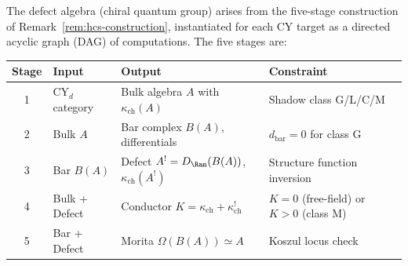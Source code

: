 The defect algebra (chiral quantum group) arises from the five-stage construction of Remark~\ref{rem:hcs-construction}, instantiated for each CY target as a directed acyclic graph (DAG) of computations. The five stages are:
\begin{center}
\small
\renewcommand{\arraystretch}{1.3}
\begin{tabular}{clll}
\toprule
\textbf{Stage} & \textbf{Input} & \textbf{Output} & \textbf{Constraint} \\
\midrule
1 & CY$_d$ category & Bulk algebra $A$ with $\kappa_{\mathrm{ch}}(A)$ & Shadow class G/L/C/M \\
2 & Bulk $A$ & Bar complex $B(A)$, differentials & $d_{\mathrm{bar}} = 0$ for class G \\
3 & Bar $B(A)$ & Defect $A^! = D_{\Ran}(B(A))$, $\kappa_{\mathrm{ch}}(A^!)$ & Structure function inversion \\
4 & Bulk + Defect & Conductor $K = \kappa_{\mathrm{ch}} + \kappa_{\mathrm{ch}}^!$ & $K = 0$ (free-field) or $K > 0$ (class M) \\
5 & Bar + Defect & Morita $\Omega(B(A)) \simeq A$ & Koszul locus check \\
\bottomrule
\end{tabular}
\end{center}

